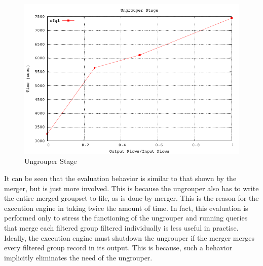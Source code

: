 \begin{figure}[h!]
  \begin{center}
    \includegraphics* [width=0.8\linewidth]{figures/benchmarks/ungrouper}
    \caption{Ungrouper Stage}
    \label{fig:benchmarks-ungrouper}
  \end{center}
\end{figure}

It can be seen that the evaluation behavior is similar to that shown by the
merger, but is just more involved. This is because the ungrouper also has to
write the entire merged groupset to file, as is done by merger. This is the
 reason for the execution
engine in taking twice the amount of time. In fact, this evaluation is
performed only to stress the functioning of the ungrouper and running queries
that merge each filtered group filtered individually is less useful in
practise. Ideally, the execution engine must shutdown the ungrouper if the
merger merges every filtered group record in its output. This is because, such
a behavior implicitly eliminates the need of the ungrouper.
